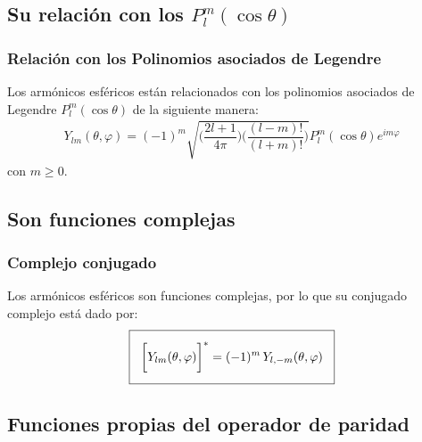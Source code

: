 \documentclass[12pt]{beamer}
\begin{document}
\subsection{Su relación con los \texorpdfstring{$P_{l}^{m}(\cos \theta)$}{Plm (cos t)}}

\begin{frame}
\frametitle{Relación con los Polinomios asociados de Legendre}
Los armónicos esféricos están relacionados con los polinomios asociados de Legendre $P_{l}^{m}(\cos \theta)$ de la siguiente manera:
\pause
\begin{align*}
Y_{lm}(\theta, \varphi) {=} (-1)^{m} \sqrt{\bigg( \dfrac{ 2 l {+} 1}{4 \pi} \bigg)\bigg( \dfrac{(l {-} m)!}{(l {+} m)!} \bigg)} P_{l}^{m} (\cos \theta) e^{i m \varphi}
\end{align*}
con $m \geq 0$.
\end{frame}

\subsection{Son funciones complejas}

\begin{frame}
\frametitle{Complejo conjugado}
Los armónicos esféricos son funciones complejas, \pause por lo que su conjugado complejo está dado por:
\begin{align*}
\setlength{\fboxsep}{3\fboxsep}\boxed{
\bigg[ Y_{lm} (\theta, \varphi) \bigg]^{*} = (-1)^{m} \, Y_{l, -m} (\theta, \varphi) }
\end{align*}
\end{frame}

\subsection{Funciones propias del operador de paridad}
\end{document}

